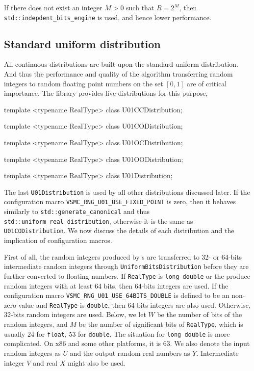 If there does not exist an integer $M > 0$ such that $R = 2^M$, then
\verb|std::indepdent_bits_engine| is used, and hence lower performance.

\subsection{Standard uniform distribution}
\label{sub:Standard uniform distribution}

All continuous distributions are built upon the standard uniform distribution.
And thus the performance and quality of the algorithm transferring random
integers to random floating point numbers on the set $[0, 1]$ are of critical
importance. The library provides five distributions for this purpose,
\begin{cppcode}
  template <typename RealType>
  class U01CCDistribution;

  template <typename RealType>
  class U01CODistribution;

  template <typename RealType>
  class U01OCDistribution;

  template <typename RealType>
  class U01OODistribution;

  template <typename RealType>
  class U01Distribution;
\end{cppcode}
The last \verb|U01Distribution| is used by all other distributions discussed
later. If the configuration macro \verb|VSMC_RNG_U01_USE_FIXED_POINT| is zero,
then it behaves similarly to \verb|std::generate_canonical| and thus
\verb|std::uniform_real_distribution|, otherwise it is the same as
\verb|U01CODistribution|. We now discuss the details of each distribution and
the implication of configuration macros.

First of all, the random integers produced by \rng{}s are transferred to 32- or
64-bits intermediate random integers through \verb|UniformBitsDistribution|
before they are further converted to floating numbers. If \verb|RealType| is
\verb|long double| or the \rng{} produce random integers with at least 64 bits,
then 64-bits integers are used. If the configuration macro
\verb|VSMC_RNG_U01_USE_64BITS_DOUBLE| is defined to be an non-zero value and
\verb|RealType| is \verb|double|, then 64-bits integers are also used.
Otherwise, 32-bits random integers are used. Below, we let $W$ be the number of
bits of the random integers, and $M$ be the number of significant bits of
\verb|RealType|, which is usually 24 for \verb|float|, 53 for \verb|double|.
The situation for \verb|long double| is more complicated. On x86 and some other
platforms, it is 63. We also denote the input random integers as $U$ and the
output random real numbers as $Y$. Intermediate integer $V$ and real $X$ might
also be used.

